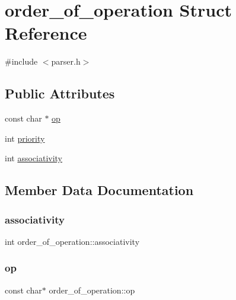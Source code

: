\hypertarget{structorder__of__operation}{}\section{order\+\_\+of\+\_\+operation Struct Reference}
\label{structorder__of__operation}


{\ttfamily \#include $<$parser.\+h$>$}

\subsection*{Public Attributes}
\begin{DoxyCompactItemize}
\item 
const char $\ast$ \hyperlink{structorder__of__operation_a841a4b6a7e32e889adabd89b818823d7}{op}
\item 
int \hyperlink{structorder__of__operation_a473d1dd1e8d79cfa6c2e84bb7402da14}{priority}
\item 
int \hyperlink{structorder__of__operation_ac799b9d51e112ea751f8f264a8962591}{associativity}
\end{DoxyCompactItemize}


\subsection{Member Data Documentation}
\mbox{\label{structorder__of__operation_ac799b9d51e112ea751f8f264a8962591}} 
\subsubsection{\texorpdfstring{associativity}{associativity}}
{\footnotesize\ttfamily int order\+\_\+of\+\_\+operation\+::associativity}

\mbox{\label{structorder__of__operation_a841a4b6a7e32e889adabd89b818823d7}} 
\subsubsection{\texorpdfstring{op}{op}}
{\footnotesize\ttfamily const char$\ast$ order\+\_\+of\+\_\+operation\+::op}


